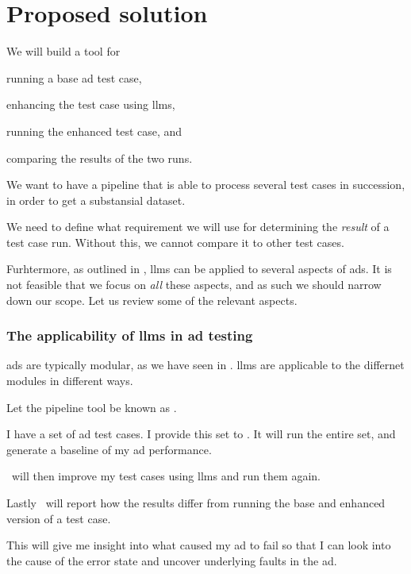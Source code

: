 \section{Proposed solution}\label{sec:solutionProposal}

We will build a tool for
\begin{inparaenum}
    \item running a base \acrshort{ad} test case,
    \item enhancing the test case using \acrshort{llms},
    \item running the enhanced test case,
    and
    \item comparing the results of the two runs.
\end{inparaenum}

We want to have a pipeline that is able to process several test cases in succession, in order to get
a substansial dataset.

We need to define what requirement we will use for determining the \textit{result} of a test case
run. Without this, we cannot compare it to other test cases.

Furhtermore, as outlined in \citeauthor{LLM4AD}, \acrlong{llms} can be applied to several aspects
of \acrlong{ads}. It is not feasible that we focus on \textit{all} these aspects, and as such we
should narrow down our scope. Let us review some of the relevant aspects.

\subsubsection{The applicability of \acrshort{llms} in \acrshort{ad} testing}

\acrlong{ads} are typically modular, as we have seen in .
\acrshort{llms} are applicable to the differnet modules in different ways.




Let the pipeline tool be known as \hefe.


\begin{tcolorbox}[colback=gray!5!white,colframe=gray!75!black,title=User history
        of using \hefe]\label{user-history}
    I have a set of \acrfull{ad} test cases. I provide this set to \hefe. It will run the entire
    set, and generate a baseline of my \acrshort{ad} performance.

    \hefe~will then improve my test cases using \acrlong{llms} and run them again.

    Lastly \hefe~will report how the results differ from running the base and enhanced version of a
    test case.

    This will give me insight into what caused my \acrshort{ad} to fail so that I can look into the
    cause of the error state and uncover underlying faults in the \acrlong{ad}.

\end{tcolorbox}


